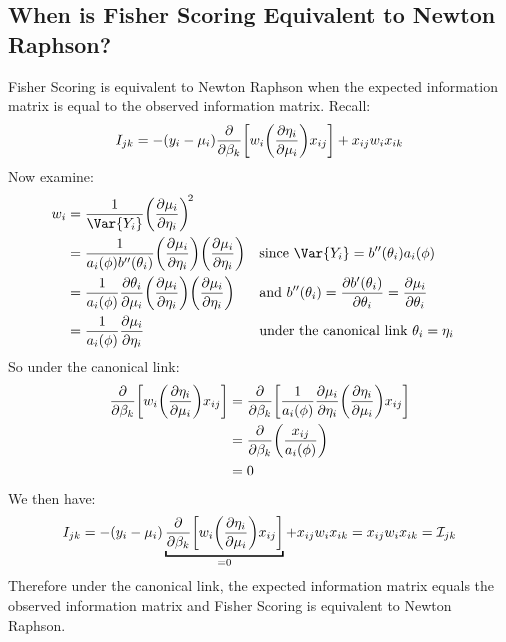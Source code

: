 \documentclass[oneside]{book}\usepackage[]{graphicx}\usepackage[svgnames]{xcolor}
\begin{document}
\subsection*{When is Fisher Scoring Equivalent to Newton Raphson?}
Fisher Scoring is equivalent to Newton Raphson when the expected information matrix is equal to the observed information matrix. Recall:
\[ I_{jk}=-(y_i-\mu_i)\pdv*{\biggl[w_i\biggl(\pdv{\eta_i}{\mu_i}\biggr)x_{ij}\biggr]}{\beta_k}+x_{ij}w_i x_{ik} \]
Now examine:
\begin{align*}
    w_i
     & =\frac{1}{\Var{Y_i}} \biggl(\pdv{\mu_i}{\eta_i}\biggr)^{\!2}                                                                                                                                                             \\
     & =\frac{1}{a_i(\phi)b^{\prime\prime}(\theta_i)} \biggl(\pdv{\mu_i}{\eta_i}\biggr) \biggl(\pdv{\mu_i}{\eta_i}\biggr) &  & \text{since $\Var{Y_i}=b^{\prime\prime}(\theta_i)a_i(\phi)$}                                     \\
     & =\frac{1}{a_i(\phi)}\pdv{\theta_i}{\mu_i} \biggl(\pdv{\mu_i}{\eta_i}\biggr) \biggl(\pdv{\mu_i}{\eta_i}\biggr)      &  & \text{and $b^{\prime\prime}(\theta_i)=\pdv{b^\prime(\theta_i)}{\theta_i}=\pdv{\mu_i}{\theta_i}$} \\
     & =\frac{1}{a_i(\phi)} \pdv{\mu_i}{\eta_i}                                                                           &  & \text{under the canonical link $\theta_i=\eta_i$}
\end{align*}
So under the canonical link:
\begin{align*}
    \pdv*{\biggl[w_i\biggl(\pdv{\eta_i}{\mu_i}\biggr)x_{ij}\biggr]}{\beta_k}
     & =\pdv*{\biggl[\frac{1}{a_i(\phi)} \pdv{\mu_i}{\eta_i}\biggl(\pdv{\eta_i}{\mu_i}\biggr)x_{ij}\biggr]}{\beta_k} \\
     & =\pdv*{\biggl(\frac{x_{ij}}{a_i(\phi)}\biggr)}{\beta_k}                                                       \\
     & =0
\end{align*}
We then have:
\[ I_{jk}=-(y_i-\mu_i)\underbracket{\pdv*{\biggl[w_i\biggl(\pdv{\eta_i}{\mu_i}\biggr)x_{ij}\biggr]}{\beta_k}}_{=0}+x_{ij}w_i x_{ik}=x_{ij}w_ix_{ik}=\mathcal{I}_{jk} \]
Therefore under the canonical link, the expected information matrix equals the
observed information matrix and Fisher Scoring is equivalent to Newton Raphson.
\end{document}
